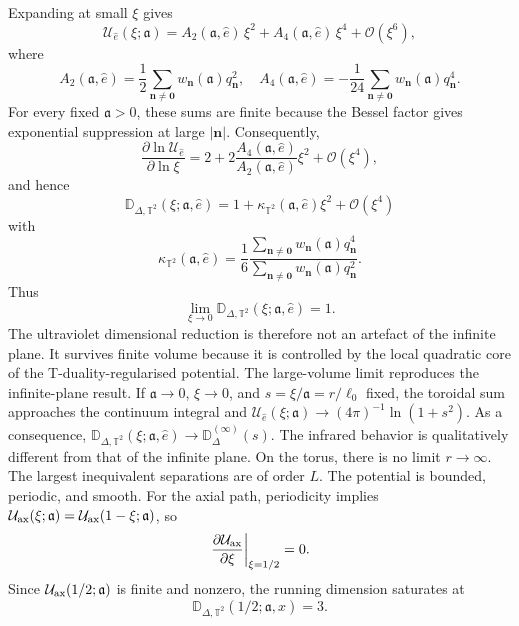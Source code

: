 \documentclass[openacc]{rsproca_new}%
\begin{document}
Expanding at small $\xi$ gives
\begin{equation}\label{smallxi}
  \mathcal U_{\hat e}(\xi;\mathfrak{a})=A_2(\mathfrak{a},\hat e)\,\xi^2+A_4(\mathfrak{a},\hat e)\,\xi^4+\mathcal{O}(\xi^6),
\end{equation}
where
\begin{equation}
  A_2(\mathfrak{a},\hat e)=\frac{1}{2}\sum_{\mathbf n\neq\mathbf 0} w_{\mathbf n}(\mathfrak{a})q_{\mathbf n}^2,\quad  A_4(\mathfrak{a},\hat e)=-\frac{1}{24}\sum_{\mathbf n\neq\mathbf 0}w_{\mathbf n}(\mathfrak{a})q_{\mathbf n}^4.
\end{equation}
For every fixed $\mathfrak{a} > 0$, these sums are finite because the Bessel factor gives exponential suppression at large $|\mathbf n|$. Consequently,
\begin{equation}
  \frac{\partial\ln\mathcal U_{\hat e}}{\partial\ln\xi}=2+2\frac{A_4(\mathfrak{a},\hat e)}{A_2(\mathfrak{a},\hat e)}\xi^2+\mathcal{O}(\xi^4),
\end{equation}
and hence
\begin{equation}
  \mathbb D_{\Delta,\mathbb T^2}(\xi;\mathfrak{a},\hat e)=1+\kappa_{\mathbb T^2}(\mathfrak{a},\hat e)\xi^2+\mathcal{O}(\xi^4)
\end{equation}
with
\begin{equation}
  \kappa_{\mathbb T^2}(\mathfrak{a},\hat e)=\frac{1}{6}\frac{\displaystyle\sum_{\mathbf n\neq\mathbf 0}w_{\mathbf n}(\mathfrak{a})q_{\mathbf n}^4}{\displaystyle\sum_{\mathbf n\neq\mathbf 0}w_{\mathbf n}(\mathfrak{a})q_{\mathbf n}^2}.
\end{equation}
Thus
\begin{equation}
  \lim_{\xi\to 0}\mathbb D_{\Delta,\mathbb T^2}(\xi;\mathfrak{a},\hat e)=1. 
\end{equation}
The ultraviolet dimensional reduction is therefore not an artefact of the infinite plane. It survives finite volume because it is controlled by the local quadratic core of the T-duality-regularised potential. The large-volume limit reproduces the infinite-plane result. If $\mathfrak{a}\to 0$, $\xi\to 0$, and $s=\xi/\mathfrak{a}=r/\ell_0$ fixed, the toroidal sum approaches the continuum integral and $\mathcal U_{\hat e}(\xi;\mathfrak{a})\longrightarrow(4\pi)^{-1}\ln(1+s^2)$. As a consequence, $\mathbb D_{\Delta,\mathbb T^2}(\xi;\mathfrak{a},\hat e)\longrightarrow\mathbb D_\Delta^{(\infty)}(s)$. The infrared behavior is qualitatively different from that of the infinite plane. On the torus, there is no limit $r\to\infty$. The largest inequivalent separations are of order $L$. The potential is bounded, periodic, and smooth. For the axial path, periodicity implies $\mathcal U_{\rm ax}(\xi;\mathfrak{a})=\mathcal U_{\rm ax}(1-\xi;\mathfrak{a})$, so
\begin{equation}
  \left.\frac{\partial\mathcal U_{\rm ax}}{\partial\xi}\right|_{\xi=1/2}=0.
\end{equation}
Since $\mathcal U_{\rm ax}(1/2;\mathfrak{a})$ is finite and nonzero, the running dimension saturates at
\begin{equation}
  \mathbb D_{\Delta,\mathbb T^2}(1/2;\mathfrak{a},\hat x)=3.
\end{equation}
\end{document}
